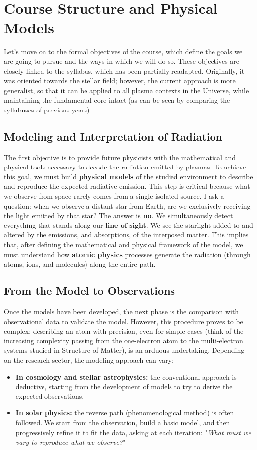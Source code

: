 \section{Course Structure and Physical Models}
Let's move on to the formal objectives of the course, which define the goals we are going to pursue and the ways in which we will do so. These objectives are closely linked to the syllabus, which has been partially readapted. Originally, it was oriented towards the stellar field; however, the current approach is more generalist, so that it can be applied to all plasma contexts in the Universe, while maintaining the fundamental core intact (as can be seen by comparing the syllabuses of previous years).

    \subsection{Modeling and Interpretation of Radiation}
    The first objective is to provide future physicists with the mathematical and physical tools necessary to decode the radiation emitted by plasmas. To achieve this goal, we must build \textbf{physical models} of the studied environment to describe and reproduce the expected radiative emission. This step is critical because what we observe from space rarely comes from a single isolated source. I ask a question: when we observe a distant star from Earth, are we exclusively receiving the light emitted by that star? The answer is \textbf{no}. We simultaneously detect everything that stands along our \textbf{line of sight}. We see the starlight added to and altered by the emissions, and absorptions, of the interposed matter. This implies that, after defining the mathematical and physical framework of the model, we must understand how \textbf{atomic physics} processes generate the radiation (through atoms, ions, and molecules) along the entire path.
    
    \subsection{From the Model to Observations}
    Once the models have been developed, the next phase is the comparison with observational data to validate the model. However, this procedure proves to be complex: describing an atom with precision, even for simple cases (think of the increasing complexity passing from the one-electron atom to the multi-electron systems studied in Structure of Matter), is an arduous undertaking. Depending on the research sector, the modeling approach can vary:\begin{itemize}\item \textbf{In cosmology and stellar astrophysics:} the conventional approach is deductive, starting from the development of models to try to derive the expected observations.\item \textbf{In solar physics:} the reverse path (phenomenological method) is often followed. We start from the observation, build a basic model, and then progressively refine it to fit the data, asking at each iteration: "\textit{What must we vary to reproduce what we observe?}"\end{itemize}
    
